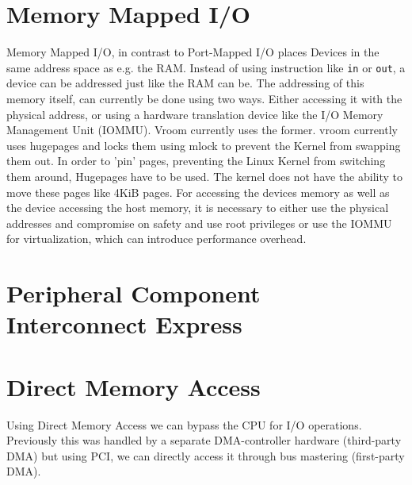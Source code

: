\section{Memory Mapped I/O}
Memory Mapped I/O, in contrast to Port-Mapped I/O places Devices in the same address space as e.g. the RAM. Instead of using instruction like \texttt{in} or \texttt{out}, a device can be addressed just like the RAM can be. The addressing of this memory itself, can currently be done using two ways. Either accessing it with the physical address, or using a hardware translation device like the I/O Memory Management Unit (IOMMU). Vroom currently uses the former. %
vroom currently uses hugepages and locks them using mlock to prevent the Kernel from swapping them out. In order to 'pin' pages, preventing the Linux Kernel from switching them around, Hugepages have to be used. The kernel does not have the ability to move these pages like 4KiB pages.
For accessing the devices memory as well as the device accessing the host memory, it is necessary to either use the physical addresses and compromise on safety and use root privileges or use the IOMMU for virtualization, which can introduce performance overhead.


\section{Peripheral Component Interconnect Express}

\section{Direct Memory Access}
Using Direct Memory Access we can bypass the CPU for I/O operations. Previously this was handled by a separate DMA-controller hardware (third-party DMA) but using PCI, we can directly access it through bus mastering (first-party DMA).

